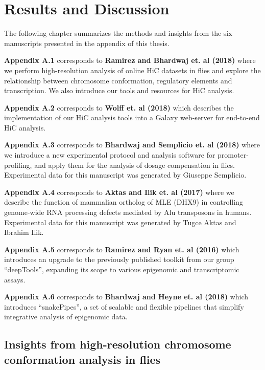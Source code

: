 \documentclass[11pt,twoside]{MPIthesis}
\theoremstyle{definition}
\theoremstyle{definition}
\theoremstyle{definition}
\theoremstyle{remark}
\begin{document}
\chapter{Results and Discussion}\label{results-and-discussion}

The following chapter summarizes the methods and insights from the six
manuscripts presented in the appendix of this thesis.

\textbf{Appendix A.1} corresponds to \textbf{Ramirez and Bhardwaj et. al
(2018)} where we perform high-resolution analysis of online HiC datasets
in flies and explore the relationship between chromosome conformation,
regulatory elements and transcription. We also introduce our tools and
resources for HiC analysis.

\textbf{Appendix A.2} corresponds to \textbf{Wolff et. al (2018)} which
describes the implementation of our HiC analysis tools into a Galaxy
web-server for end-to-end HiC analysis.

\textbf{Appendix A.3} corresponds to \textbf{Bhardwaj and Semplicio et.
al (2018)} where we introduce a new experimental protocol and analysis
software for promoter-profiling, and apply them for the analysis of
dosage compensation in flies. Experimental data for this manuscript was
generated by Giuseppe Semplicio.

\textbf{Appendix A.4} corresponds to \textbf{Aktas and Ilik et. al
(2017)} where we describe the function of mammalian ortholog of MLE
(DHX9) in controlling genome-wide RNA processing defects mediated by Alu
transposons in humans. Experimental data for this manuscript was
generated by Tugce Aktas and Ibrahim Ilik.

\textbf{Appendix A.5} corresponds to \textbf{Ramirez and Ryan et. al
(2016)} which introduces an upgrade to the previously published toolkit
from our group ``deepTools'', expanding its scope to various epigenomic
and transcriptomic assays.

\textbf{Appendix A.6} corresponds to \textbf{Bhardwaj and Heyne et. al
(2018)} which introduces ``snakePipes'', a set of scalable and flexible
pipelines that simplify integrative analysis of epigenomic data.

\section{Insights from high-resolution chromosome conformation analysis
in
flies}\label{insights-from-high-resolution-chromosome-conformation-analysis-in-flies}
\end{document}
